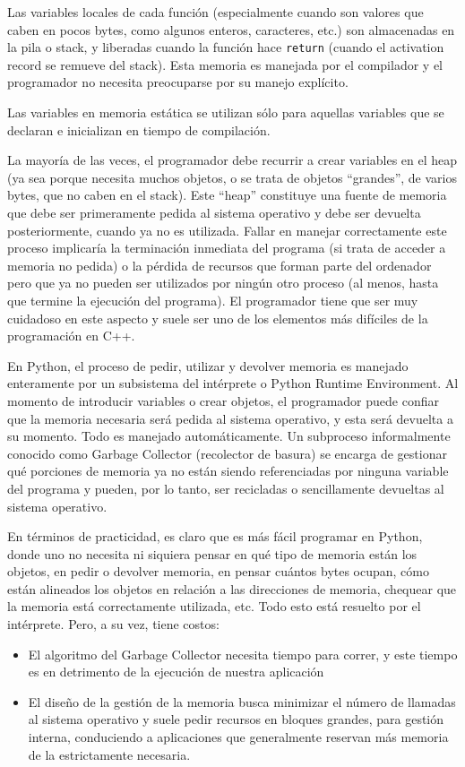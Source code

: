 \documentclass[]{article}
\begin{document}
Las variables locales de cada función (especialmente cuando son valores que
caben en pocos bytes, como algunos enteros, caracteres, etc.) son almacenadas
en la pila o stack, y liberadas cuando la función hace \verb!return! (cuando el
activation record se remueve del stack). Esta memoria es manejada por el
compilador y el programador no necesita preocuparse por su manejo explícito.

Las variables en memoria estática se utilizan sólo para aquellas variables que
se declaran e inicializan en tiempo de compilación.

La mayoría de las veces, el programador debe recurrir a crear variables en el
heap (ya sea porque necesita muchos objetos, o se trata de objetos ``grandes'',
de varios bytes, que no caben en el stack). Este ``heap'' constituye una fuente
de memoria que debe ser primeramente pedida al sistema operativo y debe ser
devuelta posteriormente, cuando ya no es utilizada. Fallar en manejar
correctamente este proceso implicaría la terminación inmediata del programa (si
trata de acceder a memoria no pedida) o la pérdida de recursos que forman parte
del ordenador pero que ya no pueden ser utilizados por ningún otro proceso (al
menos, hasta que termine la ejecución del programa). El programador tiene que
ser muy cuidadoso en este aspecto y suele ser uno de los elementos más
difíciles de la programación en C++.

En Python, el proceso de pedir, utilizar y devolver memoria es manejado
enteramente por un subsistema del intérprete o Python Runtime Environment. Al
momento de introducir variables o crear objetos, el programador puede confiar
que la memoria necesaria será pedida al sistema operativo, y esta será devuelta
a su momento. Todo es manejado automáticamente. Un subproceso informalmente
conocido como Garbage Collector (recolector de basura) se encarga de gestionar
qué porciones de memoria ya no están siendo referenciadas por ninguna variable
del programa y pueden, por lo tanto, ser recicladas o sencillamente devueltas
al sistema operativo.

En términos de practicidad, es claro que es más fácil programar en Python,
donde uno no necesita ni siquiera pensar en qué tipo de memoria están los
objetos, en pedir o devolver memoria, en pensar cuántos bytes ocupan, cómo
están alineados los objetos en relación a las direcciones de memoria, chequear
que la memoria está correctamente utilizada, etc. Todo esto está resuelto por
el intérprete. Pero, a su vez, tiene costos:

\begin{itemize}
    \item El algoritmo del Garbage Collector necesita tiempo para correr, y
este tiempo es en detrimento de la ejecución de nuestra aplicación

    \item El diseño de la gestión de la memoria busca minimizar el número de
llamadas al sistema operativo y suele pedir recursos en bloques grandes, para
gestión interna, conduciendo a aplicaciones que generalmente reservan más
memoria de la estrictamente necesaria.
\end{itemize}
\end{document}
